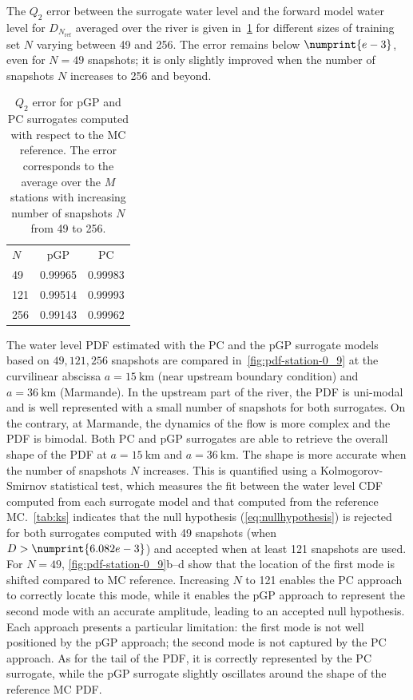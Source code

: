 The $Q_2$ error between the surrogate water level and the forward model water level for $D_{N_{\text{ref}}}$ averaged over the river is given in~\cref{tab:valid_model} for different  sizes of training set $N$ varying between 49 and 256. The error remains below $\numprint{e-3}$, even for $N = 49$ snapshots; it is only slightly improved when the number of snapshots $N$ increases to 256 and beyond. 
\begin{table}[H]
\centering
\caption{$Q_2$ error for pGP and PC surrogates computed with respect to the MC reference. The error corresponds to the average over the $M$ stations with increasing number of snapshots $N$ from 49 to 256.}
\begin{tabular}{lcc}
\toprule
$N$ & pGP & PC \\
\cmidrule{2-3}
49  & 0.99965 & 0.99983\\
121 & 0.99514 & 0.99993\\
256 & 0.99143 & 0.99962\\
\bottomrule
\end{tabular}
\label{tab:valid_model}
\end{table}

The water level PDF estimated with the PC and the pGP surrogate models based on $49, 121, 256$ snapshots are compared in~\cref{fig:pdf-station-0_9} at the curvilinear abscissa $a = 15~\text{km}$ (near upstream boundary condition) and $a = 36~\text{km}$ (Marmande). In the upstream part of the river, the PDF is uni-modal and is well represented with a small number of snapshots for both surrogates. On the contrary, at Marmande, the dynamics of the flow is more complex and the PDF is bimodal. Both PC and pGP surrogates are able to retrieve the overall shape of the PDF at $a = 15~\text{km}$ and $a = 36~\text{km}$. The shape is more accurate when the number of snapshots $N$ increases. This is quantified using a Kolmogorov-Smirnov statistical test, which measures the fit between the water level CDF computed from each surrogate model and that computed from the reference MC.~\cref{tab:ks} indicates that the null hypothesis (\cref{eq:nullhypothesis}) is rejected for both surrogates computed with 49 snapshots (when $D > \numprint{6.082e-3}$) and accepted when at least 121 snapshots are used. For $N = 49$, \cref{fig:pdf-station-0_9}b--d show that the location of the first mode is shifted compared to MC reference. Increasing $N$ to 121 enables the PC approach to correctly locate this mode, while it enables the pGP approach to represent the second mode with an accurate amplitude, leading to an accepted null hypothesis. Each approach presents a particular limitation: the first mode is not well positioned by the pGP approach; the second mode is not captured by the PC approach. As for the tail of the PDF, it is correctly represented by the PC surrogate, while the pGP surrogate slightly oscillates around the shape of the reference MC PDF.

